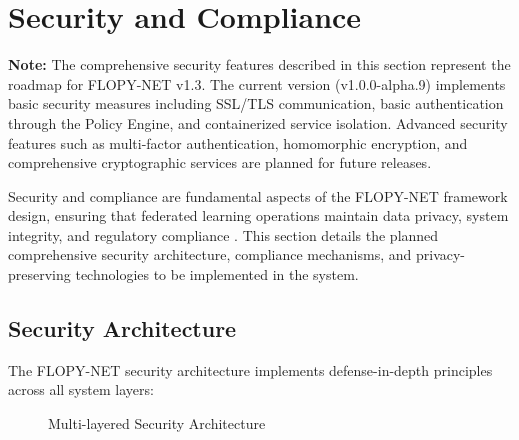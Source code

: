 \section{Security and Compliance}
\label{sec:security-compliance}

\textbf{Note:} The comprehensive security features described in this section represent the roadmap for FLOPY-NET v1.3. The current version (v1.0.0-alpha.9) implements basic security measures including SSL/TLS communication, basic authentication through the Policy Engine, and containerized service isolation. Advanced security features such as multi-factor authentication, homomorphic encryption, and comprehensive cryptographic services are planned for future releases.

Security and compliance are fundamental aspects of the FLOPY-NET framework design, ensuring that federated learning operations maintain data privacy, system integrity, and regulatory compliance \cite{mothukuri2021survey}. This section details the planned comprehensive security architecture, compliance mechanisms, and privacy-preserving technologies to be implemented in the system.

\subsection{Security Architecture}

The FLOPY-NET security architecture implements defense-in-depth principles across all system layers:

\begin{figure}[htbp]
\centering
{}
\caption{Multi-layered Security Architecture}
\label{fig:security-arch}
\end{figure}

